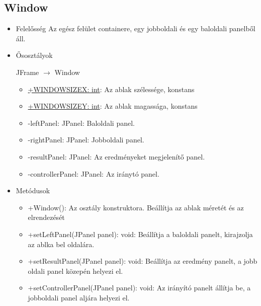 \subsection{Window}
\begin{itemize}
	\item Felelősség\newline
	Az egész felület containere, egy jobboldali és egy baloldali panelből áll.
	\item Ősosztályok\newline

		JFrame $\rightarrow$ Window

	\begin{itemize}
		\item \underline{+WINDOWSIZEX: int}: Az ablak szélessége, konstans
		\item \underline{+WINDOWSIZEY: int}: Az ablak magassága, konstans
		\item -leftPanel: JPanel: Baloldali panel.
		\item -rightPanel: JPanel: Jobboldali panel.
		\item -resultPanel: JPanel: Az eredményeket megjelenítő panel.
		\item -controllerPanel: JPanel: Az iránytó panel.
	\end{itemize}
	\item Metódusok\newline
	\begin{itemize}
		\item +Window(): Az osztály konstruktora. Beállítja az ablak méretét és az elrendezését
		\item +setLeftPanel(JPanel panel): void: Beállítja a baloldali panelt, kirajzolja az ablka bel oldalára.
		\item +setResultPanel(JPanel panel): void: Beállítja az eredmény panelt, a jobb oldali panel közepén helyezi el.
		\item +setControllerPanel(JPanel panel): void: Az irányító panelt állítja be, a jobboldali panel aljára helyezi el.
	\end{itemize}
\end{itemize}

